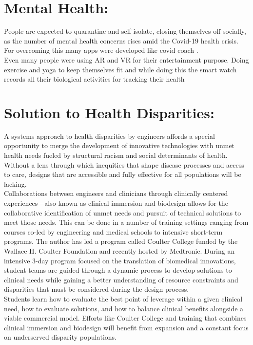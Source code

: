 \documentclass[a4paper,12pt]{article}
\begin{document}
\section{Mental Health:}
People are expected to quarantine and self-isolate, closing themselves off
socially, as the number of mental health concerns rises amid the Covid-19
health crisis. For overcoming this many apps were developed like covid coach
. 
\\
Even many people were using AR and VR for their entertainment purpose.
Doing exercise and yoga to keep themselves fit and while doing this the smart
watch records all their biological activities for tracking their health
\\
\section{Solution to Health Disparities:}
A
 systems approach
  to health disparities 
  by engineers affords
a special opportunity
    to merge the development of innovative technologies with unmet
health needs fueled by structural racism and social determinants of health.
Without
 a lens
  through
   which
    inequities
     that shape
      disease
       processes
        and
access to care,
         designs that are accessible and 
         fully
        effective for all populations
will be lacking. 
\\
Collaborations between engineers and clinicians through
clinically
 centered experiences—also known as clinical immersion
  and biodesign allows
   for the collaborative 
  identification of unmet needs and pursuit
of technical solutions to meet those needs. This can be done in a number
of training settings ranging from courses co-led by engineering and medical
schools to intensive short-term programs. The author has led a program
called
 Coulter College
  funded by the Wallace H.
   Coulter Foundation and 
   recently hosted by Medtronic. During an intensive
    3-day
  program focused on
the translation of biomedical innovations, student teams are guided through
a 
dynamic process to develop solutions to clinical needs while gaining a better understanding of resource constraints and disparities that must be considered during the design
 process.
\\
 Students learn how to evaluate the best point
of leverage within a given clinical need, how to evaluate solutions, and how
to balance clinical benefits alongside a viable commercial model. Efforts like
Coulter College and training that combines clinical immersion and biodesign
will benefit from expansion and a constant focus on underserved disparity
populations.
\end{document}
